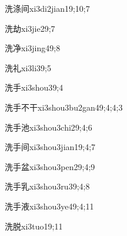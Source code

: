 \begin{verbete}{洗涤间}{xi3di2jian1}{9;10;7}
\end{verbete}

\begin{verbete}{洗劫}{xi3jie2}{9;7}
\end{verbete}

\begin{verbete}{洗净}{xi3jing4}{9;8}
\end{verbete}

\begin{verbete}{洗礼}{xi3li3}{9;5}
\end{verbete}

\begin{verbete}{洗手}{xi3shou3}{9;4}
\end{verbete}

\begin{verbete}{洗手不干}{xi3shou3bu2gan4}{9;4;4;3}
\end{verbete}

\begin{verbete}{洗手池}{xi3shou3chi2}{9;4;6}
\end{verbete}

\begin{verbete}{洗手间}{xi3shou3jian1}{9;4;7}
\end{verbete}

\begin{verbete}{洗手盆}{xi3shou3pen2}{9;4;9}
\end{verbete}

\begin{verbete}{洗手乳}{xi3shou3ru3}{9;4;8}
\end{verbete}

\begin{verbete}{洗手液}{xi3shou3ye4}{9;4;11}
\end{verbete}

\begin{verbete}{洗脱}{xi3tuo1}{9;11}
\end{verbete}

